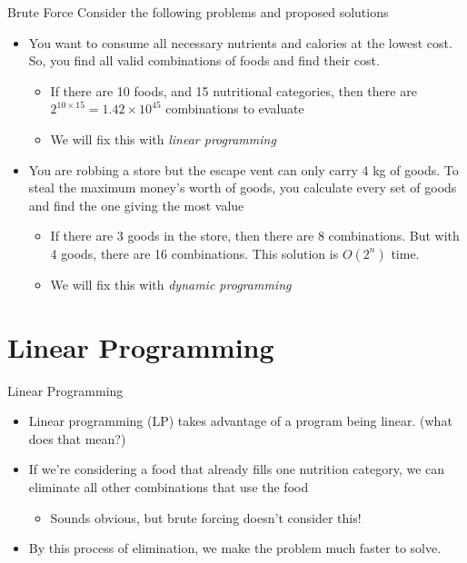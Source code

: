 \documentclass[
  ignorenonframetext,
]{beamer}
\providecommand{\tightlist}{%
  \setlength{\itemsep}{0pt}\setlength{\parskip}{0pt}}\usepackage{longtable,booktabs,array}
\begin{document}
\begin{frame}{Brute Force}
\protect\hypertarget{brute-force}{}
Consider the following problems and proposed solutions

\begin{itemize}
\item
  You want to consume all necessary nutrients and calories at the lowest
  cost. So, you find all valid combinations of foods and find their
  cost.

  \begin{itemize}
  \item
    If there are 10 foods, and 15 nutritional categories, then there are
    \(2^{10 \times 15} = 1.42 \times 10^{45}\) combinations to evaluate
  \item
    We will fix this with \emph{linear programming}
  \end{itemize}
\item
  You are robbing a store but the escape vent can only carry 4 kg of
  goods. To steal the maximum money's worth of goods, you calculate
  every set of goods and find the one giving the most value

  \begin{itemize}
  \item
    If there are 3 goods in the store, then there are 8 combinations.
    But with 4 goods, there are 16 combinations. This solution is
    \(O(2^n)\) time.
  \item
    We will fix this with \emph{dynamic programming}
  \end{itemize}
\end{itemize}
\end{frame}

\hypertarget{linear-programming}{%
\section{Linear Programming}\label{linear-programming}}

\begin{frame}{Linear Programming}
\protect\hypertarget{linear-programming-1}{}
\begin{itemize}
\item
  Linear programming (LP) takes advantage of a program being linear.
  (what does that mean?)
\item
  If we're considering a food that already fills one nutrition category,
  we can eliminate all other combinations that use the food

  \begin{itemize}
  \tightlist
  \item
    Sounds obvious, but brute forcing doesn't consider this!
  \end{itemize}
\item
  By this process of elimination, we make the problem much faster to
  solve.
\end{itemize}
\end{frame}
\end{document}
